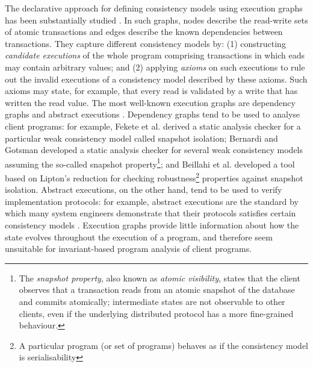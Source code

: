 The declarative approach for defining 
consistency models using execution graphs has been substantially
studied \cite{adya,ev_transactions,framework-concur,SIanalysis,laws}. 
In such graphs, nodes describe the read-write sets of  atomic transactions and edges describe the
known dependencies between transactions.
They capture different consistency models by:
(1) constructing  \emph{candidate executions} of the whole program comprising
transactions in which eads may contain arbitrary values; and 
(2) applying  \emph{axioms}  on such executions to rule out the invalid executions of 
a consistency model described by these axioms. 
Such axioms may state, for example, that every read is
validated by a write that has written the read value. 
The most well-known execution graphs are dependency graphs \cite{adya} and abstract
executions \cite{ev_transactions,framework-concur}. 
Dependency graphs tend to be used to analyse  client programs: for
example, 
Fekete et al. \citet{fekete-tods} derived 
a static analysis checker for a particular weak consistency model called
snapshot isolation;  Bernardi and Gotsman \citet{giovanni_concur16}
developed a static analysis checker for several weak consistency
models assuming the so-called snapshot property\footnote{The \emph{snapshot property}, 
also known as \emph{atomic visibility}, states that
the client observes that a transaction reads from an atomic snapshot
of the database and commits atomically;  intermediate states are not observable to other clients, 
even if the underlying distributed protocol has a more fine-grained behaviour.}; and 
Beillahi et al. \citep{snapshot-isolation-robust-tool} developed a tool based on Lipton's reduction \cite{Lipton-reduction}
for checking robustness\footnote{A particular program (or set of programs) behaves as if the consistency model is serialisability} properties against snapshot isolation.
Abstract executions, on the other hand, tend to be used to verify  implementation protocols: for example,
abstract executions are the  standard by which many system engineers
demonstrate that their protocols satisfies  certain
consistency models \cite{cops,NMSI,PSI}. 
Execution graphs provide little information about how the 
state evolves throughout the execution of a program, and 
therefore seem  unsuitable for invariant-based program analysis 
of client programs. 



